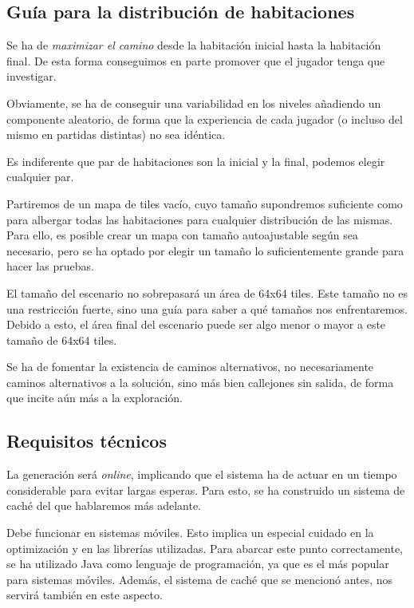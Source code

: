 \subsection{Guía para la distribución de habitaciones}

Se ha de \emph{maximizar el camino} desde la habitación inicial hasta la habitación final. De esta forma conseguimos en parte promover que el jugador tenga que investigar.

Obviamente, se ha de conseguir una variabilidad en los niveles añadiendo un componente aleatorio, de forma que la experiencia de cada jugador (o incluso del mismo en partidas distintas) no sea idéntica.

Es indiferente que par de habitaciones son la inicial y la final, podemos elegir cualquier par.

Partiremos de un mapa de tiles vacío, cuyo tamaño supondremos suficiente como para albergar todas las habitaciones para cualquier distribución de las mismas. Para ello, es posible crear un mapa con tamaño autoajustable según sea necesario, pero se ha optado por elegir un tamaño lo suficientemente grande para hacer las pruebas.

El tamaño del escenario no sobrepasará un área de 64x64 tiles. Este tamaño no es una restricción fuerte, sino una guía para saber a qué tamaños nos enfrentaremos. Debido a esto, el área final del escenario puede ser algo menor o mayor a este tamaño de 64x64 tiles.

Se ha de fomentar la existencia de caminos alternativos, no necesariamente caminos alternativos a la solución, sino más bien callejones sin salida, de forma que incite aún más a la exploración.

\subsection{Requisitos técnicos}

La generación será \emph{online}, implicando que el sistema ha de actuar en un tiempo considerable para evitar largas esperas. Para esto, se ha construido un sistema de caché del que hablaremos más adelante.

Debe funcionar en sistemas móviles. Esto implica un especial cuidado en la optimización y en las librerías utilizadas. Para abarcar este punto correctamente, se ha utilizado Java como lenguaje de programación, ya que es el más popular para sistemas móviles. Además, el sistema de caché que se mencionó antes, nos servirá también en este aspecto.




